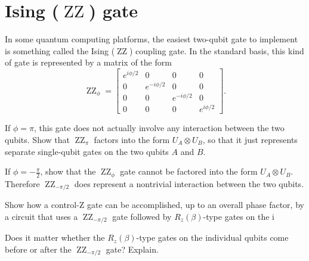 \documentclass{../phys084}
\DeclareMathOperator{\ising}{ZZ}
\begin{document}
\section{Ising (\(\ising\)) gate}

\begin{exercise}
  In some quantum computing platforms, the easiest two-qubit gate to
  implement is something called the Ising (\(\ising\)) coupling gate.
  In the standard basis, this kind of gate is represented by a matrix
  of the form
  \[
    \ising_\phi =
    \begin{bmatrix}
      e^{i\phi/2} & 0 & 0 & 0 \\
      0 & e^{-i\phi/2} & 0 & 0 \\
      0 & 0 & e^{-i\phi/2} & 0 \\
      0 & 0 & 0 & e^{i\phi/2}
    \end{bmatrix}.
  \]
  \begin{problems}
  \item If \(\phi = \pi\), this gate does not actually involve any
    interaction between the two qubits.  Show that \(\ising_\pi\)
    factors into the form \(U_A \otimes U_B\), so that it just
    represents separate single-qubit gates on the two qubits \(A\) and
    \(B\).

  \item If \(\phi = -\frac \pi 2\), show that the \(\ising_\phi\) gate
    cannot be factored into the form \(U_A \otimes U_B\).  Therefore
    \(\ising_{-\pi/2}\) does represent a nontrivial interaction
    between the two qubits.

  \item Show how a control-Z gate can be accomplished, up to an
    overall phase factor, by a circuit that uses a \(\ising_{-\pi/2}\)
    gate followed by \(R_z(\beta)\)-type gates on the i

  \item Does it matter whether the \(R_z(\beta)\)-type gates on the
    individual qubits come before or after the \(\ising_{-\pi/2}\)
    gate?  Explain.
  \end{problems}
\end{exercise}

\begin{solution}
  \begin{problems}
  \item
  \item
  \item
  \item
  \end{problems}
\end{solution}
\end{document}
